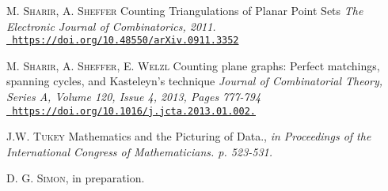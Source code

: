 \documentclass[a4paper,UKenglish,cleveref, autoref, thm-restate]{lipics-v2021}
\begin{document}
\begin{thebibliography}{1}
\textsc{M. Sharir, A. Sheffer} Counting Triangulations of Planar Point Sets \textit{The Electronic Journal of Combinatorics, 2011.} \\\href{https://doi.org/10.48550/arXiv.0911.3352}{\tt\small 
https://doi.org/10.48550/arXiv.0911.3352}

\textsc{M. Sharir, A. Sheffer, E. Welzl} Counting plane graphs: Perfect matchings, spanning cycles, and Kasteleyn's technique \textit{Journal of Combinatorial Theory, Series A, Volume 120, Issue 4, 2013,
Pages 777-794} \\\href{https://doi.org/10.1016/j.jcta.2013.01.002.}{\tt\small 
https://doi.org/10.1016/j.jcta.2013.01.002.}

\textsc{J.W. Tukey} Mathematics and the Picturing of Data., \textit{in Proceedings of the International Congress of Mathematicians. p. 523-531.}

 \textsc{D. G. Simon}, in preparation.

\end{thebibliography}
\end{document}

